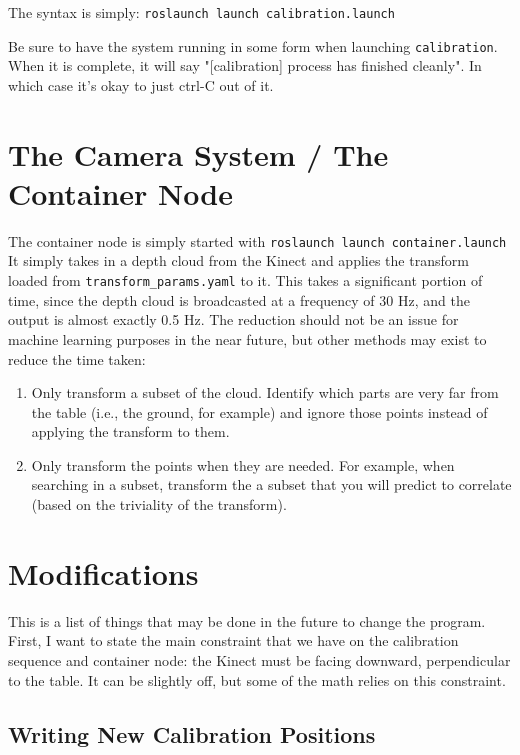 \documentclass{article}
\begin{document}
The syntax is simply: \texttt{roslaunch launch calibration.launch}

Be sure to have the system running in some form when launching \texttt{calibration}. When it is complete, it will say "[calibration] process has finished cleanly". In which case it's okay to just ctrl-C out of it.

\section{The Camera System / The Container Node}

The container node is simply started with \texttt{roslaunch launch container.launch} \\

It simply takes in a depth cloud from the Kinect and applies the transform loaded from \texttt{transform\_params.yaml} to it. This takes a significant portion of time, since the depth cloud is broadcasted at a frequency of 30 Hz, and the output is almost exactly 0.5 Hz. The reduction should not be an issue for machine learning purposes in the near future, but other methods may exist to reduce the time taken:

\begin{enumerate}
	\item Only transform a subset of the cloud. Identify which parts are very far from the table (i.e., the ground, for example) and ignore those points instead of applying the transform to them. 
	\item Only transform the points when they are needed. For example, when searching in a subset, transform the a subset that you will predict to correlate (based on the triviality of the transform).
\end{enumerate}

\section{Modifications}

This is a list of things that may be done in the future to change the program. First, I want to state the main constraint that we have on the calibration sequence and container node: the Kinect must be facing downward, perpendicular to the table. It can be slightly off, but some of the math relies on this constraint. 

\subsection{Writing New Calibration Positions}
\end{document}
